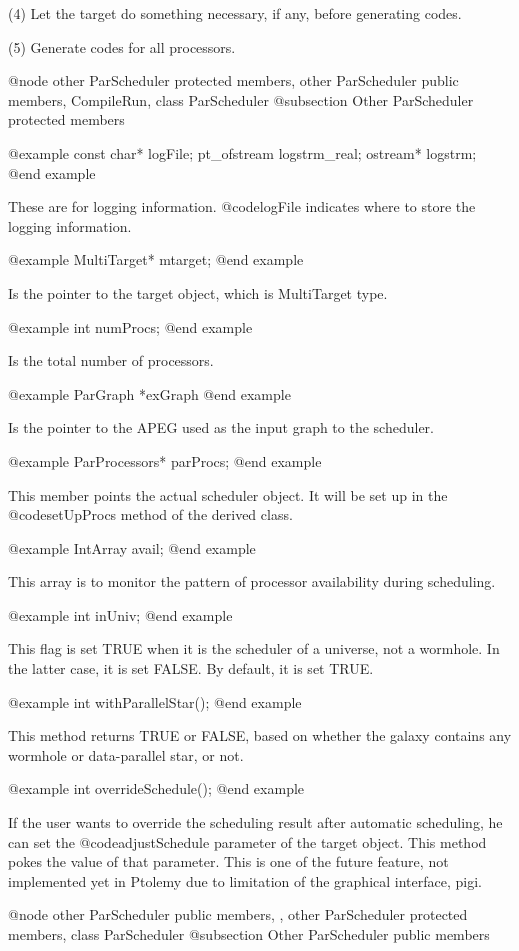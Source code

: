 (4) Let the target do something necessary, if any, before generating codes.

(5) Generate codes for all processors.

@node other ParScheduler protected members, other ParScheduler public members, CompileRun, class ParScheduler
@subsection Other ParScheduler protected members

@example
const char* logFile;
pt_ofstream logstrm_real;
ostream* logstrm;
@end example

These are for logging information. @code{logFile} indicates where to store
the logging information.

@example
MultiTarget* mtarget;
@end example

Is the pointer to the target object, which is MultiTarget type.

@example
int numProcs;
@end example

Is the total number of processors.

@example
ParGraph *exGraph
@end example

Is the pointer to the APEG used as the input graph to the scheduler.

@example
ParProcessors* parProcs;
@end example

This member points the actual scheduler object. It will be set up in the
@code{setUpProcs} method of the derived class.

@example
IntArray avail;
@end example

This array is to monitor the pattern of processor availability 
during scheduling.

@example
int inUniv;
@end example

This flag is set TRUE when it is the scheduler of a universe, not a wormhole.
In the latter case, it is set FALSE. By default, it is set TRUE.

@example 
int withParallelStar();
@end example

This method returns TRUE or FALSE, based on whether the galaxy contains 
any wormhole or data-parallel star, or not.

@example
int overrideSchedule();
@end example

If the user wants to override the scheduling result after automatic
scheduling, he can set the @code{adjustSchedule} parameter of the target
object. This method pokes the value of that parameter. This is one of
the future feature, not implemented yet in Ptolemy due to limitation of
the graphical interface, pigi.

@node other ParScheduler public members, , other ParScheduler protected members, class ParScheduler
@subsection Other ParScheduler public members

